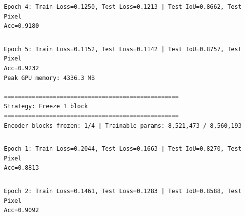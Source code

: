 \documentclass[11pt]{article}
\begin{document}
    \begin{Verbatim}[commandchars=\\\{\}]

    \end{Verbatim}

    \begin{Verbatim}[commandchars=\\\{\}]
Epoch 4: Train Loss=0.1250, Test Loss=0.1213 | Test IoU=0.8662, Test Pixel
Acc=0.9180
    \end{Verbatim}

    \begin{Verbatim}[commandchars=\\\{\}]

    \end{Verbatim}

    \begin{Verbatim}[commandchars=\\\{\}]
Epoch 5: Train Loss=0.1152, Test Loss=0.1142 | Test IoU=0.8757, Test Pixel
Acc=0.9232
Peak GPU memory: 4336.3 MB

==================================================
Strategy: Freeze 1 block
==================================================
Encoder blocks frozen: 1/4 | Trainable params: 8,521,473 / 8,560,193
    \end{Verbatim}

    \begin{Verbatim}[commandchars=\\\{\}]

    \end{Verbatim}

    \begin{Verbatim}[commandchars=\\\{\}]
Epoch 1: Train Loss=0.2044, Test Loss=0.1663 | Test IoU=0.8270, Test Pixel
Acc=0.8813
    \end{Verbatim}

    \begin{Verbatim}[commandchars=\\\{\}]

    \end{Verbatim}

    \begin{Verbatim}[commandchars=\\\{\}]
Epoch 2: Train Loss=0.1461, Test Loss=0.1283 | Test IoU=0.8588, Test Pixel
Acc=0.9092
    \end{Verbatim}

    \begin{Verbatim}[commandchars=\\\{\}]

    \end{Verbatim}
\end{document}
